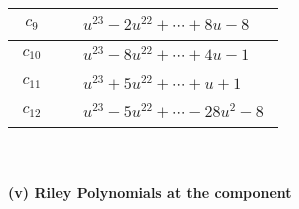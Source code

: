 \documentclass[1p]{elsarticle_modified}
\theoremstyle{definition}
\begin{document}
\begin{tabular}{m{50pt}|m{274pt}}
\hline $$\begin{aligned}c_{9}\end{aligned}$$&$\begin{aligned}
&u^{23}-2 u^{22}+\cdots+8 u-8
\end{aligned}$\\
\hline $$\begin{aligned}c_{10}\end{aligned}$$&$\begin{aligned}
&u^{23}-8 u^{22}+\cdots+4 u-1
\end{aligned}$\\
\hline $$\begin{aligned}c_{11}\end{aligned}$$&$\begin{aligned}
&u^{23}+5 u^{22}+\cdots+u+1
\end{aligned}$\\
\hline $$\begin{aligned}c_{12}\end{aligned}$$&$\begin{aligned}
&u^{23}-5 u^{22}+\cdots-28 u^2-8
\end{aligned}$\\
\hline
\end{tabular}\\~\\
\newpage\renewcommand{\arraystretch}{1}
\flushleft \textbf{(v) Riley Polynomials at the component}\newline \\
\end{document}
